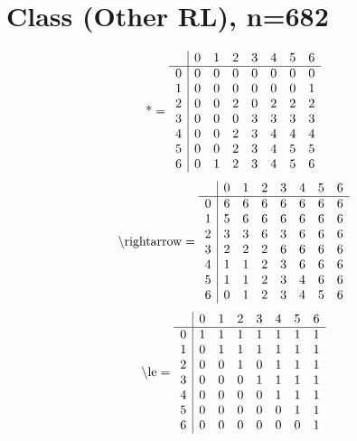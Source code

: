 \documentclass[11pt]{article}
\begin{document}
\section{Class (Other RL), n=682}
\[\text{*} = 
\begin{array}{r | r r r r r r r}
 & 0 & 1 & 2 & 3 & 4 & 5 & 6 \\ \hline
0 & 0 & 0 & 0 & 0 & 0 & 0 & 0 \\
1 & 0 & 0 & 0 & 0 & 0 & 0 & 1 \\
2 & 0 & 0 & 2 & 0 & 2 & 2 & 2 \\
3 & 0 & 0 & 0 & 3 & 3 & 3 & 3 \\
4 & 0 & 0 & 2 & 3 & 4 & 4 & 4 \\
5 & 0 & 0 & 2 & 3 & 4 & 5 & 5 \\
6 & 0 & 1 & 2 & 3 & 4 & 5 & 6 \\
\end{array}
\]
\[\text{\textbackslash rightarrow} = 
\begin{array}{r | r r r r r r r}
 & 0 & 1 & 2 & 3 & 4 & 5 & 6 \\ \hline
0 & 6 & 6 & 6 & 6 & 6 & 6 & 6 \\
1 & 5 & 6 & 6 & 6 & 6 & 6 & 6 \\
2 & 3 & 3 & 6 & 3 & 6 & 6 & 6 \\
3 & 2 & 2 & 2 & 6 & 6 & 6 & 6 \\
4 & 1 & 1 & 2 & 3 & 6 & 6 & 6 \\
5 & 1 & 1 & 2 & 3 & 4 & 6 & 6 \\
6 & 0 & 1 & 2 & 3 & 4 & 5 & 6 \\
\end{array}
\]
\[\text{\textbackslash le} = 
\begin{array}{r | r r r r r r r}
 & 0 & 1 & 2 & 3 & 4 & 5 & 6 \\ \hline
0 & 1 & 1 & 1 & 1 & 1 & 1 & 1 \\
1 & 0 & 1 & 1 & 1 & 1 & 1 & 1 \\
2 & 0 & 0 & 1 & 0 & 1 & 1 & 1 \\
3 & 0 & 0 & 0 & 1 & 1 & 1 & 1 \\
4 & 0 & 0 & 0 & 0 & 1 & 1 & 1 \\
5 & 0 & 0 & 0 & 0 & 0 & 1 & 1 \\
6 & 0 & 0 & 0 & 0 & 0 & 0 & 1 \\
\end{array}
\]
\end{document}
